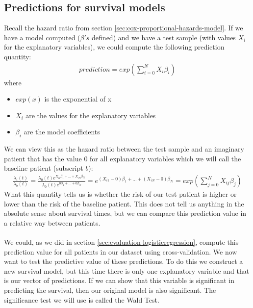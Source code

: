 \subsection{Predictions for survival models}
Recall the hazard ratio from section \ref{sec:cox-proportional-hazards-model}. If we have a model computed ($\beta's$ defined) and we have a test sample (with values $X_{i}$ for the explanatory variables), we could compute the following prediction quantity:
\begin{equation}
\begin{split}
prediction = exp(\sum_{i=0}^{N}X_{i}\beta_{i})
\end{split}
\end{equation}
where
\begin{itemize}
	\item $exp(x)$ is the exponential of x
	\item $X_{i}$ are the values for the explanatory variables
	\item $\beta_{i}$ are the model coefficients
\end{itemize}
 We can view this as the hazard ratio between the test sample and an imaginary patient that has the value $0$ for all explanatory variables which we will call the baseline patient (subscript $b$):
 \begin{equation}
 \begin{split}
 \frac{\lambda_{i}(t)}{\lambda_{b}(t)} 
 = \frac{\lambda_{0}(t)e^{X_{i1}\beta_{1} + ... + X_{iN}\beta_{N}}}{\lambda_{0}(t)e^{0\beta_{1} + ... + 0\beta_{N}}}
 = e^{(X_{i1}-0)\beta_{1} + ... + (X_{iN}-0)\beta_{N}} = exp(\sum_{j=0}^{N}X_{ij}\beta_{j})
 \end{split}
 \end{equation}
 What this quantity tells us is whether the risk of our test patient is higher or lower than the risk of the baseline patient. This does not tell us anything in the absolute sense about survival times, but we can compare this prediction value in a relative way between patients. \\ \\
 We could, as we did in section \ref{sec:evaluation-logisticregression}, compute this prediction value for all patients in our dataset using cross-validation. We now want to test the predictive value of these predictions. To do this we construct a new survival model, but this time there is only one explanatory variable and that is our vector of predictions. If we can show that this variable is significant in predicting the survival, then our original model is also significant. The significance test we will use is called the Wald Test.
 
